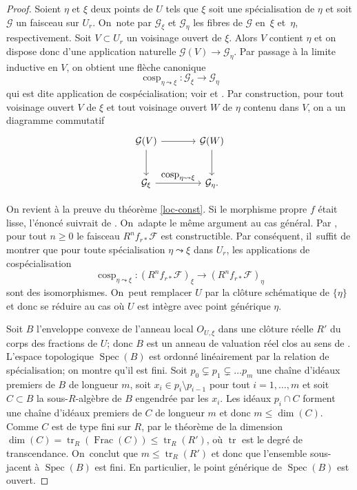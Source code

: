 \documentclass[JEP,XML,SOM,Unicode,francais,published]{cedram}
\let\ts\textstyle
\theoremstyle{definition}
\newcommand{\mc}[1]{\mathcal{#1}}
\newcommand{\on}[1]{\operatorname{#1}}
\begin{document}
\begin{proof}
Soient $\eta$ et $\xi$ deux points de $U$ tels que $\xi$ soit une spécialisation de $\eta$ et soit $\mc{G}$ un faisceau sur $U_r$. On~note par $\mc{G}_{\xi}$ et $\mc{G}_{\eta}$ les fibres de $\mc{G}$ en~$\xi$ et~$\eta$, respectivement. Soit $V\subset U_r$ un voisinage ouvert de $\xi$. Alors $V$ contient $\eta$ et on dispose donc d'une application naturelle $\mc{G}(V)\to \mc{G}_\eta$. Par passage à la limite inductive en $V$, on obtient une flèche canonique
\[\on{cosp}_{\eta\leadsto\xi}\colon \mc{G}_{\xi} \to \mc{G}_{\eta}\]
qui est dite application de cospécialisation; voir \cite[(5) p.\,203]{scheiderer1994real} et \cite[Ch.\,VIII, 7.7]{sga4II}. Par construction, pour tout voisinage ouvert $V$ de $\xi$ et tout voisinage ouvert $W$ de $\eta$ contenu dans $V$, on a un diagramme commutatif
\begin{equation}
\begin{tikzcd}[column sep = large,row sep = large]\label{cosp-square}
\mc{G}(V) \arrow[r] \arrow[d] & \mc{G}(W) \arrow[d] \\
\mc{G}_\xi \arrow[r,"\ts\on{cosp}_{\eta\leadsto\xi}"] & \mc{G}_\eta.
\end{tikzcd}
\end{equation}

On revient à la preuve du théorème \ref{loc-const}. Si le morphisme propre $f$ était lisse, l'énoncé suivrait de \cite[Cor.\,17.20(a)]{scheiderer1994real}. On~adapte le même argument au cas général. Par \cite[Th.\,17.7]{scheiderer1994real}, pour tout $n\geq 0$ le faisceau $R^n f_{r*} \mc{F}$ est constructible. Par conséquent, il~suffit de montrer que pour toute spécialisation $\eta \leadsto \xi$ dans $U_r$, les applications de cospécialisation\enlargethispage{-\baselineskip}
\[\on{cosp}_{\eta\leadsto\xi}\colon (R^n f_{r*} \mc{F})_{\xi} \to (R^n f_{r*} \mc{F})_{\eta}\] sont des isomorphismes. On~peut remplacer $U$ par la clôture schématique de $\{\eta\}$ et donc se réduire au cas où $U$ est intègre avec point générique $\eta$.

Soit $B$ l'enveloppe convexe de l'anneau local $O_{U,\xi}$ dans une clôture réelle $R'$ du corps des fractions de $U$; donc $B$ est un anneau de valuation réel clos au sens de \cite[(1.5)]{scheiderer1994real}. L'espace topologique $\on{Spec}(B)$ est ordonné linéairement par la relation de spécialisation; on montre qu'il est fini. Soit $p_0\subsetneq p_1\subsetneq\dots p_m$ une chaîne d’idéaux premiers de $B$ de longueur $m$, soit $x_i\in p_i\setminus p_{i-1}$ pour tout $i=1,\dots, m$ et soit $C\subset B$ la sous-$R$-algèbre de $B$ engendrée par les $x_i$. Les idéaux $p_i\cap C$ forment une chaîne d’idéaux premiers de $C$ de longueur $m$ et donc $m\leq \on{dim}(C)$. Comme $C$ est de type fini sur $R$, par le théorème de la dimension $\on{dim}(C)=\on{tr}_R(\on{Frac}(C))\leq \on{tr}_R(R')$, où $\on{tr}$ est le degré de transcendance. On~conclut que $m\leq \on{tr}_R(R')$ et donc que l'ensemble sous-jacent à $\on{Spec}(B)$ est fini. En particulier, le point générique de $\on{Spec}(B)$ est ouvert.


\end{proof}
\end{document}
